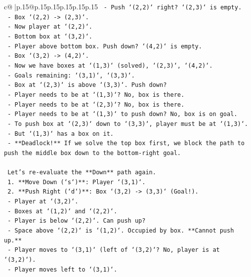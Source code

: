 \documentclass{article}
\begin{document}
{\begin{supertabular}{c@{$\;$}|p{.15\linewidth}@{}p{.15\linewidth}p{.15\linewidth}p{.15\linewidth}p{.15\linewidth}p{.15\linewidth}}
{{{\texttt{       {-} Push `(2,2)` right? `(2,3)` is empty.} \\
\texttt{       {-} Box `(2,2) {-}> (2,3)`.} \\
\texttt{       {-} Now player at `(2,2)`.} \\
\texttt{       {-} Bottom box at `(3,2)`.} \\
\texttt{       {-} Player above bottom box. Push down? `(4,2)` is empty.} \\
\texttt{       {-} Box `(3,2) {-}> (4,2)`.} \\
\texttt{       {-} Now we have boxes at `(1,3)` (solved), `(2,3)`, `(4,2)`.} \\
\texttt{       {-} Goals remaining: `(3,1)`, `(3,3)`.} \\
\texttt{       {-} Box at `(2,3)` is above `(3,3)`. Push down?} \\
\texttt{       {-} Player needs to be at `(1,3)`? No, box is there.} \\
\texttt{       {-} Player needs to be at `(2,3)`? No, box is there.} \\
\texttt{       {-} Player needs to be at `(1,3)` to push down? No, box is on goal.} \\
\texttt{       {-} To push box at `(2,3)` down to `(3,3)`, player must be at `(1,3)`.} \\
\texttt{       {-} But `(1,3)` has a box on it.} \\
\texttt{       {-} **Deadlock!** If we solve the top box first, we block the path to push the middle box down to the bottom{-}right goal.} \\
\\ 
\texttt{    Let's re{-}evaluate the **Down** path again.} \\
\texttt{    1. **Move Down (`s`)**: Player `(3,1)`.} \\
\texttt{    2. **Push Right (`d`)**: Box `(3,2) {-}> (3,3)` (Goal!).} \\
\texttt{       {-} Player at `(3,2)`.} \\
\texttt{       {-} Boxes at `(1,2)` and `(2,2)`.} \\
\texttt{       {-} Player is below `(2,2)`. Can push up?} \\
\texttt{       {-} Space above `(2,2)` is `(1,2)`. Occupied by box. **Cannot push up.**} \\
\texttt{       {-} Player moves to `(3,1)` (left of `(3,2)`? No, player is at `(3,2)`).} \\
\texttt{       {-} Player moves left to `(3,1)`.} \\
}}}
\end{supertabular}}
\end{document}
